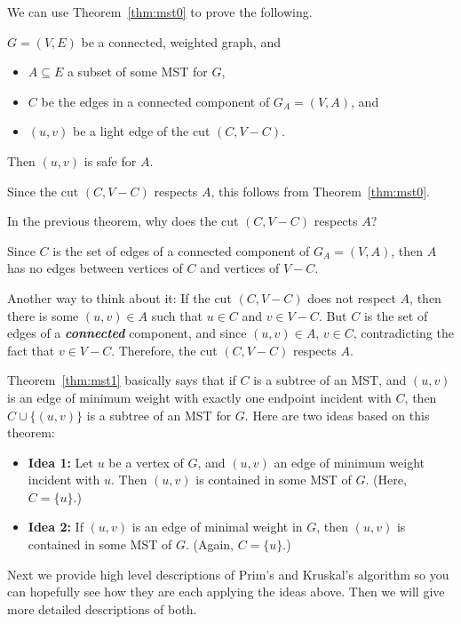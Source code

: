 We can use Theorem~\ref{thm:mst0}
to prove the following.

\begin{thm}\label{thm:mst1}
$G\!=\!(V,E)$ be a connected, weighted graph, and
\begin{itemize}
\item
$A\subseteq E$ a subset of some MST for $G$, 
\item
$C$ be the edges in a connected component of $G_A\!=\!(V,A)$, and
\item
$(u,v)$ be a light edge of the cut $(C,V-C)$.
\end{itemize}
Then $(u,v)$ is safe for $A$.
\begin{pf}
Since the cut $(C,V-C)$ respects $A$, this follows from Theorem~\ref{thm:mst0}.
\end{pf}
\end{thm}

\begin{ques}
In the previous theorem, why does the cut $(C,V-C)$ respects $A$?
\vspace*{.75in}
\begin{answer}
Since $C$ is the set of edges of a connected component of
$G_A\!=\!(V,A)$,
then $A$ has no edges between vertices 
of $C$ and vertices of $V-C$.

Another way to think about it: If the cut $(C,V-C)$ does not respect $A$,
then there is some $(u,v)\in A$ such that $u\in C$ and $v\in V-C$.
But $C$ is the set of edges of a {\bf\em connected} component, 
and since $(u,v)\in A$, $v\in C$, contradicting the fact that $v\in V-C$.
Therefore, the cut $(C,V-C)$ respects $A$.
\end{answer}
\end{ques}

Theorem~\ref{thm:mst1} basically says that if $C$ is a subtree
of an MST, and $(u,v)$ is an edge of minimum weight 
with exactly one endpoint incident with $C$,
then $C\cup\{(u,v)\}$ is a subtree
of an MST for $G$.
Here are two ideas based on this theorem:
\begin{itemize}
\item {\bf Idea 1:}
Let $u$ be a vertex of $G$, and $(u,v)$ an edge
of minimum weight incident with $u$.
Then $(u,v)$ is contained in some MST of $G$.
(Here, $C=\{u\}$.)
\item {\bf Idea 2:}
If $(u,v)$ is an edge of minimal weight in $G$,
then $(u,v)$ is contained in some MST of $G$.
(Again, $C=\{u\}$.)
\end{itemize}

Next we provide high level descriptions of Prim's and Kruskal's algorithm
so you can hopefully see how they are each applying the ideas above.
Then we will give more detailed descriptions of both.

